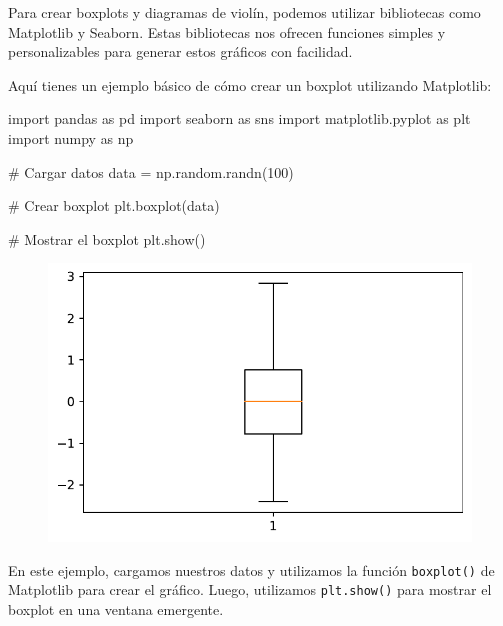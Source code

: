 \documentclass[
  a4paper,
]{article}
\newenvironment{Shaded}{}{}
\newcommand{\CommentTok}[1]{\textcolor[rgb]{0.42,0.45,0.49}{#1}}
\newcommand{\DecValTok}[1]{\textcolor[rgb]{0.00,0.36,0.77}{#1}}
\newcommand{\ImportTok}[1]{\textcolor[rgb]{0.01,0.18,0.38}{#1}}
\newcommand{\NormalTok}[1]{\textcolor[rgb]{0.14,0.16,0.18}{#1}}
\newcommand{\OperatorTok}[1]{\textcolor[rgb]{0.14,0.16,0.18}{#1}}
\begin{document}
Para crear boxplots y diagramas de violín, podemos utilizar bibliotecas
como Matplotlib y Seaborn. Estas bibliotecas nos ofrecen funciones
simples y personalizables para generar estos gráficos con facilidad.

Aquí tienes un ejemplo básico de cómo crear un boxplot utilizando
Matplotlib:

\begin{Shaded}
\begin{Highlighting}[]
\ImportTok{import}\NormalTok{ pandas }\ImportTok{as}\NormalTok{ pd}
\ImportTok{import}\NormalTok{ seaborn }\ImportTok{as}\NormalTok{ sns}
\ImportTok{import}\NormalTok{ matplotlib.pyplot }\ImportTok{as}\NormalTok{ plt}
\ImportTok{import}\NormalTok{ numpy }\ImportTok{as}\NormalTok{ np}

\CommentTok{\# Cargar datos}
\NormalTok{data }\OperatorTok{=}\NormalTok{ np.random.randn(}\DecValTok{100}\NormalTok{)}

\CommentTok{\# Crear boxplot}
\NormalTok{plt.boxplot(data)}

\CommentTok{\# Mostrar el boxplot}
\NormalTok{plt.show()}
\end{Highlighting}
\end{Shaded}

\begin{figure}[H]

{\centering \includegraphics{index_files/figure-pdf/cell-2-output-1.pdf}

}

\end{figure}

En este ejemplo, cargamos nuestros datos y utilizamos la función
\texttt{boxplot()} de Matplotlib para crear el gráfico. Luego,
utilizamos \texttt{plt.show()} para mostrar el boxplot en una ventana
emergente.
\end{document}
